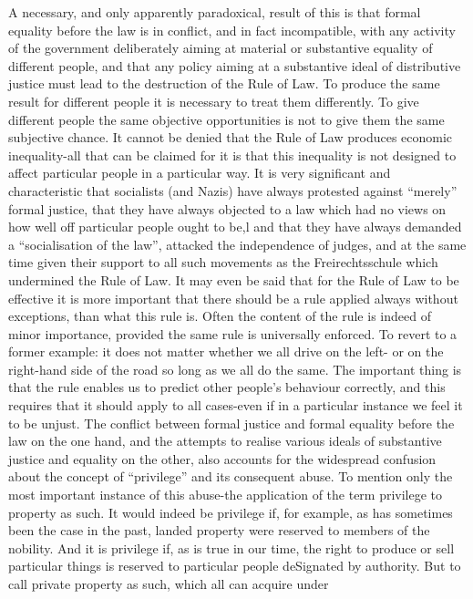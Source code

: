 \documentclass[11pt,openany]{book}
\begin{document}
A necessary, and only apparently paradoxical, result of this is that formal equality before the law is in conflict, and in fact incompatible, with any activity of the government deliberately aiming at material or substantive equality of different people, and that any policy aiming at a substantive ideal of distributive justice must lead to the destruction of the Rule of Law. To produce the same result for different people it is necessary to treat them differently. To give different people the same objective opportunities is not to give them the same subjective chance. It cannot be denied that the Rule of Law produces economic inequality-all that can be claimed for it is that this inequality is not designed to affect particular people in a particular way. It is very significant and characteristic that socialists (and Nazis) have always protested against ``merely'' formal justice, that they have always objected to a law which had no views on how well off particular people ought to be,l and that they have always demanded a ``socialisation of the law'', attacked the independence of judges, and at the same time given their support to all such movements as the Freirechtsschule which undermined the Rule of Law. It may even be said that for the Rule of Law to be effective it is more important that there should be a rule applied always without exceptions, than what this rule is. Often the content of the rule is indeed of minor importance, provided the same rule is universally enforced. To revert to a former example: it does not matter whether we all drive on the left- or on the right-hand side of the road so long as we all do the same. The important thing is that the rule enables us to predict other people's behaviour correctly, and this requires that it should apply to all cases-even if in a particular instance we feel it to be unjust. The conflict between formal justice and formal equality before the law on the one hand, and the attempts to realise various ideals of substantive justice and equality on the other, also accounts for the widespread confusion about the concept of ``privilege'' and its consequent abuse. To mention only the most important instance of this abuse-the application of the term privilege to property as such. It would indeed be privilege if, for example, as has sometimes been the case in the past, landed property were reserved to members of the nobility. And it is privilege if, as is true in our time, the right to produce or sell particular things is reserved to particular people deSignated by authority. But to call private property as such, which all can acquire under
\end{document}
